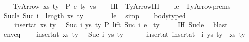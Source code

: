 \begin{isabellebody}
\isamarkupfalse%
\isanewline
\ \ \isamarkupfalse%
\ {\isacharparenleft}{\kern0pt}TyArrow\ xs\ ty{}\ {\isasymGamma}\ P\ e\ ty{}{\isacharprime}{\kern0pt}\ vs{\isacharparenright}{\kern0pt}\isanewline
\ \ \isamarkupfalse%
\ IH\ {\isacharequal}{\kern0pt}\ TyArrow{\isachardot}{\kern0pt}IH\isanewline
\ \ \isamarkupfalse%
\ le\ {\isacharequal}{\kern0pt}\ TyArrow{\isachardot}{\kern0pt}prems\isanewline
\isanewline
\ \ \isamarkupfalse%
\ Suc{\isacharunderscore}{\kern0pt}le{\isacharcolon}{\kern0pt}\ {\isachardoublequoteopen}Suc\ i\ {\isasymle}\ length\ {\isacharparenleft}{\kern0pt}{\isacharparenleft}{\kern0pt}xs{\isacharcomma}{\kern0pt}\ ty{}{\isacharparenright}{\kern0pt}\ {\isacharhash}{\kern0pt}\ {\isasymGamma}{\isacharparenright}{\kern0pt}{\isachardoublequoteclose}\isanewline
\ \ \ \ \isamarkupfalse%
\ le\ \isamarkupfalse%
\ simp\isanewline
\isanewline
\ \ \isamarkupfalse%
\ body{\isacharunderscore}{\kern0pt}typed{\isacharcolon}{\kern0pt}\isanewline
\ \ \ \ {\isachardoublequoteopen}insert{\isacharunderscore}{\kern0pt}at\ {\isacharparenleft}{\kern0pt}{\isacharparenleft}{\kern0pt}xs{\isacharcomma}{\kern0pt}\ ty{}{\isacharparenright}{\kern0pt}\ {\isacharhash}{\kern0pt}\ {\isasymGamma}{\isacharparenright}{\kern0pt}\ {\isacharparenleft}{\kern0pt}Suc\ i{\isacharparenright}{\kern0pt}\ {\isacharparenleft}{\kern0pt}ys{\isacharcomma}{\kern0pt}\ ty{}{\isacharparenright}{\kern0pt}\ {\isasymturnstile}{\isacharbraceleft}{\kern0pt}P{\isacharbraceright}{\kern0pt}\ lift\ {\isacharparenleft}{\kern0pt}Suc\ i{\isacharparenright}{\kern0pt}\ e\ {\isacharcolon}{\kern0pt}\ ty{}{\isacharprime}{\kern0pt}{\isachardoublequoteclose}\isanewline
\ \ \ \isamarkupfalse%
\ IH\ Suc{\isacharunderscore}{\kern0pt}le\ \isamarkupfalse%
\ blast\isanewline
\isanewline
\ \ \isamarkupfalse%
\ env{\isacharunderscore}{\kern0pt}eq{\isacharcolon}{\kern0pt}\isanewline
\ \ \ \ {\isachardoublequoteopen}insert{\isacharunderscore}{\kern0pt}at\ {\isacharparenleft}{\kern0pt}{\isacharparenleft}{\kern0pt}xs{\isacharcomma}{\kern0pt}\ ty{}{\isacharparenright}{\kern0pt}\ {\isacharhash}{\kern0pt}\ {\isasymGamma}{\isacharparenright}{\kern0pt}\ {\isacharparenleft}{\kern0pt}Suc\ i{\isacharparenright}{\kern0pt}\ {\isacharparenleft}{\kern0pt}ys{\isacharcomma}{\kern0pt}\ ty{}{\isacharparenright}{\kern0pt}\isanewline
\ \ \ \ \ {\isacharequal}{\kern0pt}\ insert{\isacharunderscore}{\kern0pt}at\ {\isacharparenleft}{\kern0pt}insert{\isacharunderscore}{\kern0pt}at\ {\isasymGamma}\ i\ {\isacharparenleft}{\kern0pt}ys{\isacharcomma}{\kern0pt}\ ty{}{\isacharparenright}{\kern0pt}{\isacharparenright}{\kern0pt}\ {}\ {\isacharparenleft}{\kern0pt}xs{\isacharcomma}{\kern0pt}\ ty{}{\isacharparenright}{\kern0pt}{\isachardoublequoteclose}\isanewline

\end{isabellebody}
